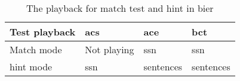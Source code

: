 \begin{table}[H]
\centering
\caption{The playback for match test and \gls{hint} in \gls{bier}}
\begin{tabular}{l|lll}
Test playback   & \gls{acs}   & \gls{ace} & \gls{bct} \\ \hline
Match mode      & Not playing & \gls{ssn} & \gls{ssn} \\
\gls{hint} mode & \gls{ssn}   & sentences & sentences
\end{tabular}
\label{append:playback_bier}
\end{table}





